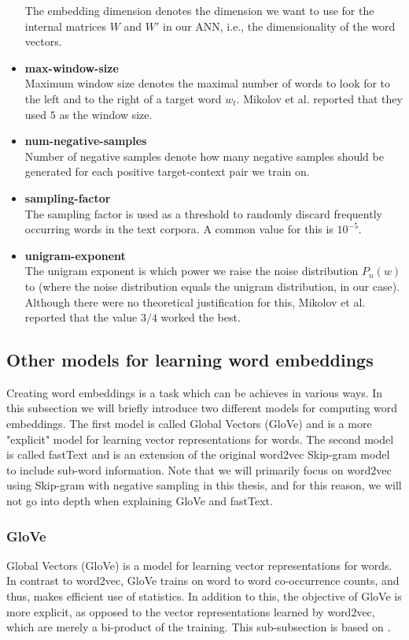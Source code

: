 \begin{itemize}
        The embedding dimension denotes the dimension we want to use for the internal matrices $W$ and $W'$ in our ANN, i.e., the dimensionality of the word vectors.
    \item \textbf{max-window-size} \\
        Maximum window size denotes the maximal number of words to look for to the left and to the right of a target word $w_t$. Mikolov et al. reported that they used $5$ as the window size.
    \item \textbf{num-negative-samples} \\
        Number of negative samples denote how many negative samples should be generated for each positive target-context pair we train on.
    \item \textbf{sampling-factor} \\
        The sampling factor is used as a threshold to randomly discard frequently occurring words in the text corpora. A common value for this is $10^{-5}$.
    \item \textbf{unigram-exponent} \\
        The unigram exponent is which power we raise the noise distribution $P_n(w)$ to (where the noise distribution equals the unigram distribution, in our case). Although there were no theoretical justification for this, Mikolov et al. reported that the value $3/4$ worked the best.
\end{itemize}

\subsection{Other models for learning word embeddings}
Creating word embeddings is a task which can be achieves in various ways. In this subsection we will briefly introduce two different models for computing word embeddings. The first model is called Global Vectors (GloVe) \cite{pennington2014glove} and is a more "explicit" model for learning vector representations for words. The second model is called fastText \cite{bojanowski2017enriching} and is an extension of the original word2vec Skip-gram model to include sub-word information. Note that we will primarily focus on word2vec using Skip-gram with negative sampling in this thesis, and for this reason, we will not go into depth when explaining GloVe and fastText.

\subsubsection{GloVe}
Global Vectors (GloVe) \cite{pennington2014glove} is a model for learning vector representations for words. In contrast to word2vec, GloVe trains on word to word co-occurrence counts, and thus, makes efficient use of statistics. In addition to this, the objective of GloVe is more explicit, as opposed to the vector representations learned by word2vec, which are merely a bi-product of the training. This sub-subsection is based on \cite{pennington2014glove}.

